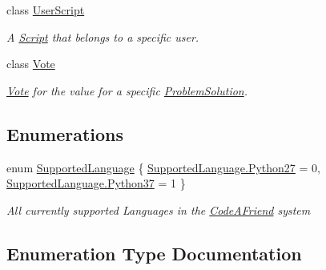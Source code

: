 \begin{DoxyCompactItemize}
class \mbox{\hyperlink{class_code_a_friend_1_1_data_model_1_1_user_script}{User\+Script}}
\begin{DoxyCompactList}\small\item\em A \mbox{\hyperlink{class_code_a_friend_1_1_data_model_1_1_script}{Script}} that belongs to a specific user. \end{DoxyCompactList}\item 
class \mbox{\hyperlink{class_code_a_friend_1_1_data_model_1_1_vote}{Vote}}
\begin{DoxyCompactList}\small\item\em \mbox{\hyperlink{class_code_a_friend_1_1_data_model_1_1_vote}{Vote}} for the value for a specific \mbox{\hyperlink{class_code_a_friend_1_1_data_model_1_1_problem_solution}{Problem\+Solution}}. \end{DoxyCompactList}\end{DoxyCompactItemize}
\subsection*{Enumerations}
\begin{DoxyCompactItemize}
\item 
enum \mbox{\hyperlink{namespace_code_a_friend_1_1_data_model_a13e088c525db1b03a4de75420ced79b2}{Supported\+Language}} \{ \mbox{\hyperlink{namespace_code_a_friend_1_1_data_model_a13e088c525db1b03a4de75420ced79b2a28370c6c0e2ca069f8b6085f17647e83}{Supported\+Language.\+Python27}} = 0, 
\mbox{\hyperlink{namespace_code_a_friend_1_1_data_model_a13e088c525db1b03a4de75420ced79b2aa77cf3b172f4c0b3f05cb3289f99f0b3}{Supported\+Language.\+Python37}} = 1
 \}
\begin{DoxyCompactList}\small\item\em All currently supported Languages in the \mbox{\hyperlink{namespace_code_a_friend}{Code\+A\+Friend}} system \end{DoxyCompactList}\end{DoxyCompactItemize}


\subsection{Enumeration Type Documentation}
\mbox{\label{namespace_code_a_friend_1_1_data_model_a13e088c525db1b03a4de75420ced79b2}} 
